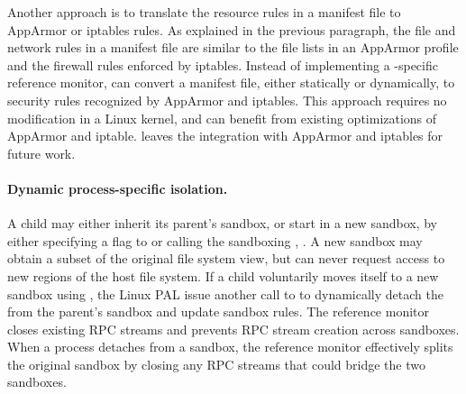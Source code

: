 Another approach is to translate the resource rules in a manifest file
to AppArmor or iptables rules.
As explained in the previous paragraph, the file and network rules in a manifest file are similar to the file lists in an AppArmor profile and the firewall rules enforced by iptables.
Instead of implementing a \graphene{}-specific reference monitor,
\graphene{} can convert a manifest file, either statically or dynamically,
to security rules recognized by AppArmor and iptables.
This approach requires no modification
in a Linux kernel, and can benefit from
existing optimizations of AppArmor and iptable. %
\graphene{} leaves the integration with AppArmor and iptables for future work.




\paragraph{Dynamic process-specific isolation.}
A child \picoproc{} may either inherit its parent's sandbox, 
or start in a new sandbox,
by either specifying a flag to  or calling the sandboxing \hostapi{}, .
A new sandbox may obtain a subset of the original file system view,
but can never request access to new regions of the 
host file system. 
If a child \picoproc{} voluntarily moves itself to a new sandbox
using ,
the Linux PAL issue another  call to 
to dynamically detach
the \picoproc{}
from the parent's sandbox and update sandbox rules. The reference monitor
closes existing RPC streams and prevents RPC stream creation 
across sandboxes.
When a process detaches from a sandbox,
the reference monitor effectively splits the original sandbox
by closing any RPC streams that could bridge the two sandboxes.


\begin{comment}
We hasten to note that program counter filtering
is only provided for backwards compatibility, not security.
An attacker can compromise the \pal{}, so system policies are enforced
externally by the reference monitor.


Dynamically redirecting system calls to {\tt libLinux} is 
less efficient than dynamically linking against
the \graphene{} libc or statically compiling {\tt libLinux} into the application.
The overhead of dynamic redirection comes from 
transferring control to the kernel, then back to 
the \pal{}, and then to {\tt libLinux}.
We leave exploration of more efficient alternatives for future work,
such as redirecting the hardware system call table to {\tt libLinux}
on a host system like Dune~\cite{belay12dune},
or dynamically rewriting parts of the static binary~\cite{hunt99detours}.
\end{comment}


